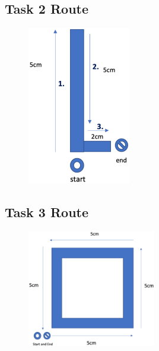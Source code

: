 \documentclass[oneside,%
                    author={Malak Hajji},
                    degree={BSc},
                    title={Designing An Accessible Ozobot Programming Platform for Students},
                  subtitle={With Mixed Visual Abilities}]{dissertation}
\begin{document}
\subsection{Task 2 Route}
\FloatBarrier
\begin{figure}[h]
    \centering
    \includegraphics[width=0.4\textwidth]{thesis/task2route.eps}
    \label{fig-route2}
\end{figure}
\FloatBarrier

\subsection{Task 3 Route}
\FloatBarrier
\begin{figure}[h]
    \centering
    \includegraphics[width=0.5\textwidth]{thesis/squareroute.eps}
    \label{fig-route3}
\end{figure}
\FloatBarrier
\end{document}
